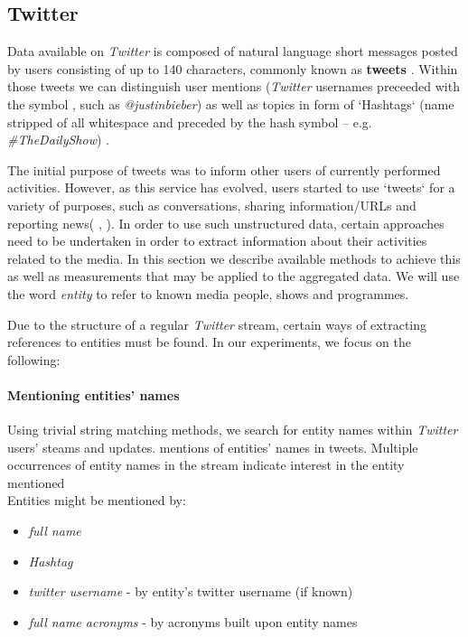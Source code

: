 \newpage
\subsection{Twitter}

Data available on \textit{Twitter} is composed of natural language short messages posted by users
consisting of up to 140 characters, commonly known as \textbf{tweets} \cite{why-we-twitter}. Within
those tweets we can distinguish user mentions (\textit{Twitter} usernames preceeded with the symbol \@,
such as \textit{@justinbieber}) as well as topics in form of `Hashtags` (name stripped of all whitespace
and preceded by the hash symbol -- e.g. \textit{\#TheDailyShow}) \cite{edinburg-corpus}.

The initial purpose of tweets was to inform other users of currently performed activities. However, as this service has
evolved, users started to use `tweets` for a variety of purposes, such as conversations, sharing information/URLs and reporting news(\cite{why-we-twitter} , \cite{twitter-content-is-it}). In order to use such unstructured data,
certain approaches need to be undertaken in order to extract information about their activities related to
the media. In this section we describe available methods to achieve this as well as measurements
that may be applied to the aggregated data. We will use the word \textit{entity} to refer to
known media people, shows and programmes.

Due to the structure of a regular \textit{Twitter} stream, certain ways of extracting references to entities
must be found. In our experiments, we focus on the following:

\paragraph{Mentioning entities' names}
Using trivial string matching methods, we search for entity names within \textit{Twitter} users' steams and updates.
mentions of entities' names in tweets. Multiple occurrences of entity names in the stream indicate interest
in the entity mentioned \cite{twitter-content-is-it} \\
Entities might be mentioned by:
\begin{itemize}
  \item \textit{full name}
  \item \textit{Hashtag}
  \item \textit{twitter username} - by entity's twitter username (if known)
  \item \textit{full name acronyms} - by acronyms built upon entity names
\end{itemize}
